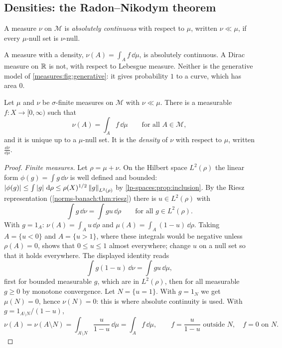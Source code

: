 \begin{notechapter}
\section{Densities: the Radon--Nikodym theorem}
\label{lp-spaces:sec:rn}

\begin{definition}\label{lp-spaces:def:ac}
A measure $\nu$ on $\mathcal M$ is \emph{absolutely continuous} with
respect to $\mu$, written $\nu\ll\mu$, if every $\mu$-null set is
$\nu$-null.
\end{definition}

A measure with a density, $\nu(A) = \int_Af\,\dd\mu$, is absolutely
continuous. A Dirac measure on $\mathbb{R}$ is not, with respect to Lebesgue
measure. Neither is the generative model of
\cref{measures:fig:generative}: it gives probability $1$ to a curve,
which has area $0$.

\begin{theorem}\label{lp-spaces:thm:rn}
Let $\mu$ and $\nu$ be $\sigma$-finite measures on $\mathcal M$ with
$\nu\ll\mu$. There is a measurable $f:X\to[0, \infty)$ such that
\[
  \nu(A) = \int_Af\,\dd\mu\qquad\text{for all }A\in\mathcal M ,
\]
and it is unique up to a $\mu$-null set. It is the \emph{density} of
$\nu$ with respect to $\mu$, written $\frac{\dd\nu}{\dd\mu}$.
\end{theorem}

\begin{proof}
\emph{Finite measures.} Let $\rho = \mu + \nu$. On the Hilbert space
$L^2(\rho)$ the linear form $\phi(g) = \int g\,\dd\nu$ is well defined
and bounded:
$\left|\phi(g)\right|\leq\int\left|g\right|\,\mathrm{d}\rho\leq\rho(X)^{1/2}\left\|g\right\|_{L^2(\rho)}$
by \cref{lp-spaces:prop:inclusion}. By the Riesz representation
(\cref{norms-banach:thm:riesz}) there is $u\in L^2(\rho)$ with
\[
  \int g\,\dd\nu = \int gu\,\dd\rho\qquad\text{for all }g\in L^2(\rho) .
\]
With $g = 1_A$: $\nu(A) = \int_Au\,\dd\rho$ and
$\mu(A) = \int_A(1 - u)\,\dd\rho$. Taking $A = \{u < 0\}$ and
$A = \{u > 1\}$, where these integrals would be negative unless
$\rho(A) = 0$, shows that $0\leq u\leq1$ almost everywhere; change $u$ on
a null set so that it holds everywhere. The displayed identity reads
\[
  \int g(1 - u)\,\dd\nu = \int gu\,\dd\mu ,
\]
first for bounded measurable $g$, which are in $L^2(\rho)$, then for all
measurable $g\geq0$ by monotone convergence. Let $N = \{u = 1\}$. With
$g = 1_N$ we get $\mu(N) = 0$, hence $\nu(N) = 0$: this is where
absolute continuity is used. With $g = 1_{A\setminus N}/(1 - u)$,
\[
  \nu(A) = \nu(A\setminus N) = \int_{A\setminus N}\frac u{1 - u}\,\dd\mu
  = \int_Af\,\dd\mu , \qquad
  f = \frac u{1 - u}\text{ outside }N,\quad f = 0\text{ on }N .
\]


\end{proof}
\end{notechapter}
